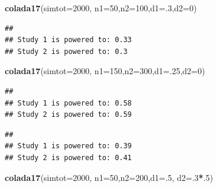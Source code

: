 \documentclass[]{book}
\newenvironment{Shaded}{\begin{snugshade}}{\end{snugshade}}
\newcommand{\CommentTok}[1]{\textcolor[rgb]{0.56,0.35,0.01}{\textit{#1}}}
\newcommand{\DataTypeTok}[1]{\textcolor[rgb]{0.13,0.29,0.53}{#1}}
\newcommand{\DecValTok}[1]{\textcolor[rgb]{0.00,0.00,0.81}{#1}}
\newcommand{\KeywordTok}[1]{\textcolor[rgb]{0.13,0.29,0.53}{\textbf{#1}}}
\newcommand{\NormalTok}[1]{#1}
\newcommand{\OperatorTok}[1]{\textcolor[rgb]{0.81,0.36,0.00}{\textbf{#1}}}
\begin{document}
\begin{Shaded}
\begin{Highlighting}[]
  \KeywordTok{colada17}\NormalTok{(}\DataTypeTok{simtot=}\DecValTok{2000}\NormalTok{, }\DataTypeTok{n1=}\DecValTok{50}\NormalTok{,}\DataTypeTok{n2=}\DecValTok{100}\NormalTok{,}\DataTypeTok{d1=}\NormalTok{.}\DecValTok{3}\NormalTok{,}\DataTypeTok{d2=}\DecValTok{0}\NormalTok{)}
\end{Highlighting}
\end{Shaded}

\begin{verbatim}
## 
## Study 1 is powered to: 0.33
## Study 2 is powered to: 0.3
\end{verbatim}

\begin{Shaded}
\begin{Highlighting}[]
  \KeywordTok{colada17}\NormalTok{(}\DataTypeTok{simtot=}\DecValTok{2000}\NormalTok{, }\DataTypeTok{n1=}\DecValTok{150}\NormalTok{,}\DataTypeTok{n2=}\DecValTok{300}\NormalTok{,}\DataTypeTok{d1=}\NormalTok{.}\DecValTok{25}\NormalTok{,}\DataTypeTok{d2=}\DecValTok{0}\NormalTok{)}
\end{Highlighting}
\end{Shaded}

\begin{verbatim}
## 
## Study 1 is powered to: 0.58
## Study 2 is powered to: 0.59
\end{verbatim}

\begin{Shaded}
\end{Shaded}

\begin{verbatim}
## 
## Study 1 is powered to: 0.39
## Study 2 is powered to: 0.41
\end{verbatim}

\begin{Shaded}
\begin{Highlighting}[]
  \KeywordTok{colada17}\NormalTok{(}\DataTypeTok{simtot=}\DecValTok{2000}\NormalTok{, }\DataTypeTok{n1=}\DecValTok{50}\NormalTok{,}\DataTypeTok{n2=}\DecValTok{200}\NormalTok{,}\DataTypeTok{d1=}\NormalTok{.}\DecValTok{5}\NormalTok{, }\DataTypeTok{d2=}\NormalTok{.}\DecValTok{3}\OperatorTok{*}\NormalTok{.}\DecValTok{5}\NormalTok{)}
\end{Highlighting}
\end{Shaded}
\end{document}

